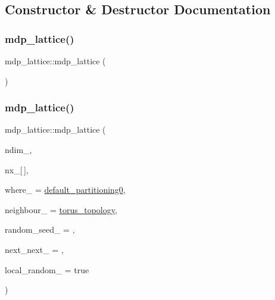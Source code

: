 \subsection{Constructor \& Destructor Documentation}
\mbox{\label{classmdp__lattice_a16771b478cc1e3a6bd70487de44e7a7a}} 
\subsubsection{\texorpdfstring{mdp\+\_\+lattice()}{mdp\_lattice()}\hspace{0.1cm}{\footnotesize\ttfamily [1/3]}}
{\footnotesize\ttfamily mdp\+\_\+lattice\+::mdp\+\_\+lattice (\begin{DoxyParamCaption}{ }\end{DoxyParamCaption})\hspace{0.3cm}{\ttfamily [inline]}}

\mbox{\label{classmdp__lattice_a90f0e67a6947ec2cab8065cef94d3ceb}} 
\subsubsection{\texorpdfstring{mdp\+\_\+lattice()}{mdp\_lattice()}\hspace{0.1cm}{\footnotesize\ttfamily [2/3]}}
{\footnotesize\ttfamily mdp\+\_\+lattice\+::mdp\+\_\+lattice (\begin{DoxyParamCaption}\item[{int}]{ndim\+\_\+,  }\item[{int}]{nx\+\_\+\mbox{[}$\,$\mbox{]},  }\item[{int($\ast$)(int $\ast$, int, int $\ast$)}]{where\+\_\+ = {\ttfamily \hyperlink{mdp__partitionings_8h_a717f073ea8969d6e22c586a8eba267ad}{default\+\_\+partitioning0}},  }\item[{void($\ast$)(int, int $\ast$, int $\ast$, int $\ast$, int, int $\ast$)}]{neighbour\+\_\+ = {\ttfamily \hyperlink{mdp__topologies_8h_a6aec8ec4cbeb8205be5727f6493824dd}{torus\+\_\+topology}},  }\item[{\hyperlink{mdp__global__vars_8h_aaa1ad9d0dcd2124aa5af0120d9954174}{mdp\+\_\+int}}]{random\+\_\+seed\+\_\+ = {},  }\item[{int}]{next\+\_\+next\+\_\+ = {},  }\item[{bool}]{local\+\_\+random\+\_\+ = {\ttfamily true} }\end{DoxyParamCaption})\hspace{0.3cm}{\ttfamily [inline]}}

